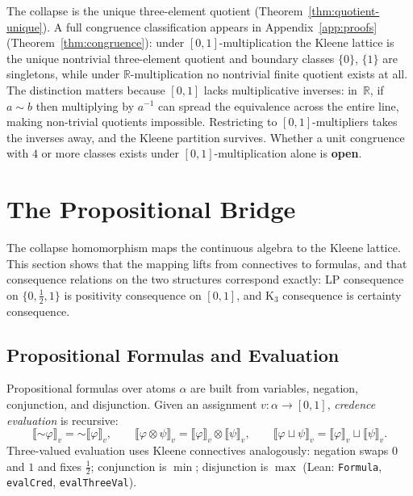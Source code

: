 \documentclass[11pt,a4paper]{article}
\newcommand{\negc}{\mathord{\sim}}
\newcommand{\conjc}{\otimes}
\newcommand{\disjc}{\sqcup}
\newcommand{\Real}{\mathbb{R}}
\begin{document}
The collapse is the unique three-element quotient
(Theorem~\ref{thm:quotient-unique}).
A full congruence classification appears in
Appendix~\ref{app:proofs} (Theorem~\ref{thm:congruence}):
under $[0,1]$-multiplication the Kleene lattice is the unique
nontrivial three-element quotient and boundary classes $\{0\}$,
$\{1\}$ are singletons, while under $\Real$-multiplication no
nontrivial finite quotient exists at all.
The distinction matters because $[0,1]$ lacks multiplicative
inverses: in~$\Real$, if $a \sim b$ then multiplying by
$a^{-1}$ can spread the equivalence across the entire line,
making non-trivial quotients impossible.
Restricting to $[0,1]$-multipliers takes the inverses away, and
the Kleene partition survives.
Whether a unit congruence with $4$ or more classes exists under
$[0,1]$-multiplication alone is \textbf{open}.

\section{The Propositional Bridge}
\label{sec:bridge}

The collapse homomorphism maps the continuous algebra to the Kleene
lattice.
This section shows that the mapping lifts from connectives to
formulas, and that consequence relations on the two structures
correspond exactly: LP consequence on $\{0, \tfrac{1}{2}, 1\}$ is
positivity consequence on $[0,1]$, and K$_3$ consequence is
certainty consequence.

\subsection{Propositional Formulas and Evaluation}
\label{sec:formulas}

Propositional formulas over atoms $\alpha$ are built from variables,
negation, conjunction, and disjunction.
Given an assignment $v : \alpha \to [0,1]$, \emph{credence evaluation}
is recursive:
\[
\llbracket \negc\varphi \rrbracket_v
= \negc \llbracket\varphi\rrbracket_v, \qquad
\llbracket \varphi \conjc \psi \rrbracket_v
= \llbracket\varphi\rrbracket_v \conjc
  \llbracket\psi\rrbracket_v, \qquad
\llbracket \varphi \disjc \psi \rrbracket_v
= \llbracket\varphi\rrbracket_v \disjc
  \llbracket\psi\rrbracket_v.
\]
Three-valued evaluation uses Kleene connectives analogously:
negation swaps $0$ and $1$ and fixes $\tfrac{1}{2}$; conjunction is
$\min$; disjunction is $\max$
(Lean: \texttt{Formula}, \texttt{evalCred}, \texttt{evalThreeVal}).
\end{document}

